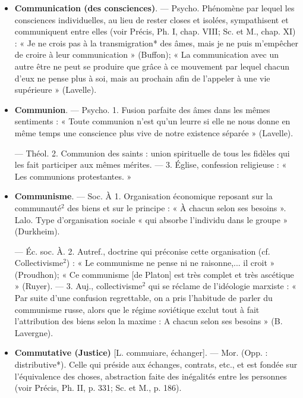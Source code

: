 \begin{itemize}[leftmargin=1cm, label=, itemsep=11pt]
\item {\bf Communication (des consciences)}. —
Psycho. Phénomène par lequel les
consciences individuelles, au lieu de
rester closes et isolées, sympathisent
et communiquent entre elles (voir
Précis, Ph. I, chap. VIII; Sc. et M.,
chap. XI) : « Je ne crois pas à la
transmigration* des âmes, mais je
ne puis m'empêcher de croire à leur
communication » (Buffon); « La
communication avec un autre être
ne peut se produire que grâce à ce
mouvement par lequel chacun d’eux
ne pense plus à soi, mais au prochain
afin de l’appeler à une vie supérieure » (Lavelle).

\item {\bf Communion}. — Psycho. 1. Fusion parfaite des âmes dans les mêmes sentiments : « Toute communion n’est
qu’un leurre si elle ne nous donne en
même temps une conscience plus
vive de notre existence séparée »
(Lavelle).

— Théol. 2. Communion des
saints : union spirituelle de tous les
fidèles qui les fait participer aux
mêmes mérites. — 3. Église, confession religieuse : « Les communions
protestantes. »

\item {\bf Communisme}. — Soc. À 1. Organisation économique reposant sur la
communauté$^2$ des biens et sur le
principe : « À chacun selon ses besoins ». Lalo. Type d'organisation
sociale « qui absorbe l’individu dans
le groupe » (Durkheim).

— Éc. soc. À. 2. Autref., doctrine
qui préconise cette organisation (cf.
Collectivisme$^2$) : « Le communisme
ne pense ni ne raisonne,... il croit »
(Proudhon); « Ce communisme [de
Platon] est très complet et très ascétique » (Ruyer). — 3. Auj., collectivisme$^2$ qui se réclame de l’idéologie marxiste : « Par suite d’une
confusion regrettable, on a pris
l'habitude de parler du communisme russe, alors que le régime
soviétique exclut tout à fait l’attribution des biens selon la maxime :
A chacun selon ses besoins » (B. Lavergne).

\item {\bf Commutative (Justice)} [L. commuiare,
échanger]. — Mor. (Opp. : distributive*). Celle qui préside aux échanges,
contrats, etc., et est fondée sur
l'équivalence des choses, abstraction faite des inégalités entre les
personnes (voir Précis, Ph. II,
p. 331; Sc. et M., p. 186).


\end{itemize}
